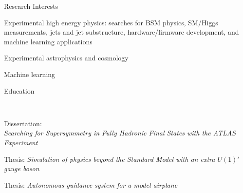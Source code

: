 \documentclass{resume}
\begin{document}

\begin{rsection}{Research Interests}
  \begin{rlist}
    \item Experimental high energy physics: searches for BSM physics, SM/Higgs measurements, jets and jet substructure, hardware/firmware development, and machine learning applications
    \item Experimental astrophysics and cosmology
    \item Machine learning 
  \end{rlist}
\end{rsection}


\begin{rsection}{Education}

  \\
  \vspace{-0.2em}
  \item Dissertation: \\{\em Searching for Supersymmetry in Fully Hadronic Final States with the ATLAS Experiment}


  \vspace{-0.2em}
  \item Thesis: {\em Simulation of physics beyond the Standard Model with an extra $U(1)'$ gauge boson}




  \vspace{-0.2em}
  \item Thesis: {\em Autonomous guidance system for a model airplane}

\end{rsection}
\end{document}
